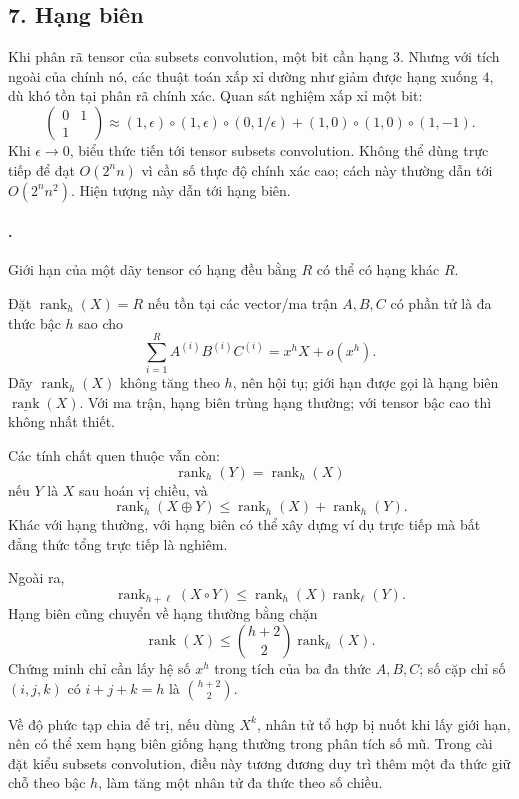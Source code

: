 \documentclass[11pt]{article}
\begin{document}
\subsection*{7. Hạng biên}

Khi phân rã tensor của subsets convolution, một bit cần hạng \(3\). Nhưng với
tích ngoài của chính nó, các thuật toán xấp xỉ dường như giảm được hạng xuống
\(4\), dù khó tồn tại phân rã chính xác. Quan sát nghiệm xấp xỉ một bit:
\[
  \begin{pmatrix}0&1\\1& \end{pmatrix}
  \approx
  (1,\epsilon)\circ(1,\epsilon)\circ(0,1/\epsilon)
  +(1,0)\circ(1,0)\circ(1,-1).
\]
Khi \(\epsilon\to 0\), biểu thức tiến tới tensor subsets convolution. Không
thể dùng trực tiếp để đạt \(O(2^n n)\) vì cần số thực độ chính xác cao; cách
này thường dẫn tới \(O(2^n n^2)\). Hiện tượng này dẫn tới hạng biên.

\paragraph{.}
Giới hạn của một dãy tensor có hạng đều bằng \(R\) có thể có hạng khác \(R\).

Đặt \(\operatorname{rank}_h(X)=R\) nếu tồn tại các vector/ma trận \(A,B,C\) có
phần tử là đa thức bậc \(h\) sao cho
\[
  \sum_{i=1}^{R}A^{(i)}B^{(i)}C^{(i)}=x^h X+o(x^h).
\]
Dãy \(\operatorname{rank}_h(X)\) không tăng theo \(h\), nên hội tụ; giới hạn
được gọi là hạng biên \(\underline{\operatorname{rank}}(X)\). Với ma trận,
hạng biên trùng hạng thường; với tensor bậc cao thì không nhất thiết.

Các tính chất quen thuộc vẫn còn:
\[
  \operatorname{rank}_h(Y)=\operatorname{rank}_h(X)
\]
nếu \(Y\) là \(X\) sau hoán vị chiều, và
\[
  \operatorname{rank}_h(X\oplus Y)\le
  \operatorname{rank}_h(X)+\operatorname{rank}_h(Y).
\]
Khác với hạng thường, với hạng biên có thể xây dựng ví dụ trực tiếp mà bất
đẳng thức tổng trực tiếp là nghiêm.

Ngoài ra,
\[
  \operatorname{rank}_{h+\ell}(X\circ Y)
  \le
  \operatorname{rank}_h(X)\operatorname{rank}_\ell(Y).
\]
Hạng biên cũng chuyển về hạng thường bằng chặn
\[
  \operatorname{rank}(X)\le \binom{h+2}{2}\operatorname{rank}_h(X).
\]
Chứng minh chỉ cần lấy hệ số \(x^h\) trong tích của ba đa thức \(A,B,C\); số
cặp chỉ số \((i,j,k)\) có \(i+j+k=h\) là \(\binom{h+2}{2}\).

Về độ phức tạp chia để trị, nếu dùng \(X^k\), nhân tử tổ hợp bị nuốt khi lấy
giới hạn, nên có thể xem hạng biên giống hạng thường trong phân tích số mũ.
Trong cài đặt kiểu subsets convolution, điều này tương đương duy trì thêm một
đa thức giữ chỗ theo bậc \(h\), làm tăng một nhân tử đa thức theo số chiều.
\end{document}
